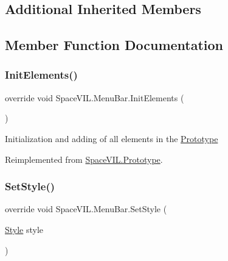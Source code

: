 \subsection*{Additional Inherited Members}


\subsection{Member Function Documentation}
\mbox{\label{class_space_v_i_l_1_1_menu_bar_a9873e7466eac5668ecc9df715b35ce08}} 
\subsubsection{\texorpdfstring{Init\+Elements()}{InitElements()}}
{\footnotesize\ttfamily override void Space\+V\+I\+L.\+Menu\+Bar.\+Init\+Elements (\begin{DoxyParamCaption}{ }\end{DoxyParamCaption})\hspace{0.3cm}{\ttfamily [virtual]}}



Initialization and adding of all elements in the \mbox{\hyperlink{class_space_v_i_l_1_1_prototype}{Prototype}} 



Reimplemented from \mbox{\hyperlink{class_space_v_i_l_1_1_prototype_ac3379fe02923ee155b5b0084abf27420}{Space\+V\+I\+L.\+Prototype}}.

\mbox{\label{class_space_v_i_l_1_1_menu_bar_a999e99bd760bb19092d309dff262ea5e}} 
\subsubsection{\texorpdfstring{Set\+Style()}{SetStyle()}}
{\footnotesize\ttfamily override void Space\+V\+I\+L.\+Menu\+Bar.\+Set\+Style (\begin{DoxyParamCaption}\item[{\mbox{\hyperlink{class_space_v_i_l_1_1_decorations_1_1_style}{Style}}}]{style }\end{DoxyParamCaption})\hspace{0.3cm}{\ttfamily [virtual]}}



